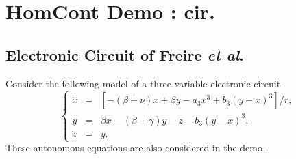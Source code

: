 \documentclass[12pt]{report}
\begin{document}
\chapter{ {\cal HomCont} Demo : cir.} \label{ch:HomCont_cir}

\section{ Electronic Circuit of Freire \textit{et al}.}
Consider the following model of a three-variable electronic circuit
\cite{FrRLuGaPo:93}
 \begin{equation}
\left \{ 
\begin{array}{rcl}
\dot{x} & = & \left [-(\beta+\nu) x + \beta y -a_3 x^3 
+b_3(y-x)^3\right ]/r, \\
\dot{y} & = & \beta x -(\beta+\gamma)y -z -b_3(y-x)^3, \\
\dot{z} & = & y.
\end{array}
\right.  
\label{5.fr1}
\end{equation}
These autonomous equations are also considered in the \AUTO demo .
\end{document}
